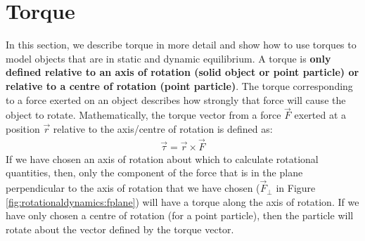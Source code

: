 \section{Torque}
In this section, we describe torque in more detail and show how to use torques to model objects that are in static and dynamic equilibrium. A torque is \textbf{only defined relative to an axis of rotation (solid object or point particle) or relative to a centre of rotation (point particle)}. The torque corresponding to a force exerted on an object describes how strongly that force will cause the object to rotate. Mathematically, the torque vector from a force $\vec F$ exerted at a position $\vec r$ relative to the axis/centre of rotation is defined as:
\begin{align*}
\vec \tau = \vec r \times \vec F
\end{align*}
If we have chosen an axis of rotation about which to calculate rotational quantities, then, only the component of the force that is in the plane perpendicular to the axis of rotation that we have chosen ($\vec F_\perp$ in Figure \ref{fig:rotationaldynamics:fplane}) will have a torque along the axis of rotation. If we have only chosen a centre of rotation (for a point particle), then the particle will rotate about the vector defined by the torque vector.
